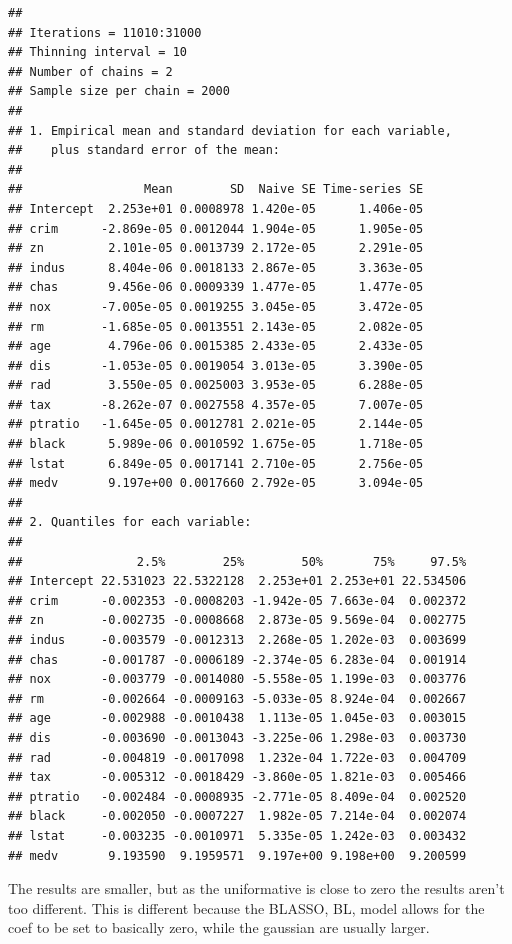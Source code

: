 \documentclass[
]{article}
\begin{document}
\begin{verbatim}
## 
## Iterations = 11010:31000
## Thinning interval = 10 
## Number of chains = 2 
## Sample size per chain = 2000 
## 
## 1. Empirical mean and standard deviation for each variable,
##    plus standard error of the mean:
## 
##                 Mean        SD  Naive SE Time-series SE
## Intercept  2.253e+01 0.0008978 1.420e-05      1.406e-05
## crim      -2.869e-05 0.0012044 1.904e-05      1.905e-05
## zn         2.101e-05 0.0013739 2.172e-05      2.291e-05
## indus      8.404e-06 0.0018133 2.867e-05      3.363e-05
## chas       9.456e-06 0.0009339 1.477e-05      1.477e-05
## nox       -7.005e-05 0.0019255 3.045e-05      3.472e-05
## rm        -1.685e-05 0.0013551 2.143e-05      2.082e-05
## age        4.796e-06 0.0015385 2.433e-05      2.433e-05
## dis       -1.053e-05 0.0019054 3.013e-05      3.390e-05
## rad        3.550e-05 0.0025003 3.953e-05      6.288e-05
## tax       -8.262e-07 0.0027558 4.357e-05      7.007e-05
## ptratio   -1.645e-05 0.0012781 2.021e-05      2.144e-05
## black      5.989e-06 0.0010592 1.675e-05      1.718e-05
## lstat      6.849e-05 0.0017141 2.710e-05      2.756e-05
## medv       9.197e+00 0.0017660 2.792e-05      3.094e-05
## 
## 2. Quantiles for each variable:
## 
##                2.5%        25%        50%       75%     97.5%
## Intercept 22.531023 22.5322128  2.253e+01 2.253e+01 22.534506
## crim      -0.002353 -0.0008203 -1.942e-05 7.663e-04  0.002372
## zn        -0.002735 -0.0008668  2.873e-05 9.569e-04  0.002775
## indus     -0.003579 -0.0012313  2.268e-05 1.202e-03  0.003699
## chas      -0.001787 -0.0006189 -2.374e-05 6.283e-04  0.001914
## nox       -0.003779 -0.0014080 -5.558e-05 1.199e-03  0.003776
## rm        -0.002664 -0.0009163 -5.033e-05 8.924e-04  0.002667
## age       -0.002988 -0.0010438  1.113e-05 1.045e-03  0.003015
## dis       -0.003690 -0.0013043 -3.225e-06 1.298e-03  0.003730
## rad       -0.004819 -0.0017098  1.232e-04 1.722e-03  0.004709
## tax       -0.005312 -0.0018429 -3.860e-05 1.821e-03  0.005466
## ptratio   -0.002484 -0.0008935 -2.771e-05 8.409e-04  0.002520
## black     -0.002050 -0.0007227  1.982e-05 7.214e-04  0.002074
## lstat     -0.003235 -0.0010971  5.335e-05 1.242e-03  0.003432
## medv       9.193590  9.1959571  9.197e+00 9.198e+00  9.200599
\end{verbatim}

The results are smaller, but as the uniformative is close to zero the
results aren't too different. This is different because the BLASSO, BL,
model allows for the coef to be set to basically zero, while the
gaussian are usually larger.
\end{document}
